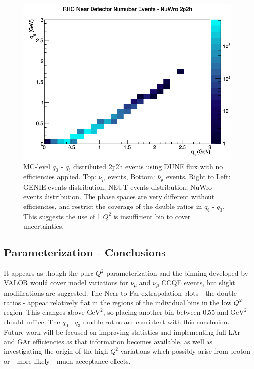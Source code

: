 \documentclass[12pt]{article}
\newcommand{\textapprox}{\raisebox{0.5ex}{\texttildelow}}
\begin{document}
\begin{figure}[h]
\endminipage
{}
\includegraphics[width=\linewidth]{q0_q3/nominal/2p2h_RHC_ND_numubar_q3_q0_NuWro.png}
\endminipage
\caption{MC-level $q_0 \textrm{ - } q_3$ distributed 2p2h events using DUNE flux with no efficiencies applied. Top: $\nu_{\mu}$ events, Bottom: $\overline{\nu}_{\mu}$ events. Right to Left: GENIE events distribution, NEUT events distribution, NuWro events distribution. The phase spaces are very different without efficiencies, and restrict the coverage of the double ratios in $q_0 \textrm{ - } q_3$. This suggests the use of 1 $Q^2$ is insufficient bin to cover uncertainties.}
\label{fig:q0q3_2p2h_events}
\end{figure}
\FloatBarrier

\subsection{Parameterization - Conclusions}
It appears as though the pure-$Q^2$ parameterization and the binning developed by VALOR would cover model variations for $\nu_{\mu}$ and $\overline{\nu}_{\mu}$ CCQE events, but slight modifications are suggested. The Near to Far extrapolation plots - the double ratios - appear relatively flat in the regions of the individual bins in the low $Q^2$ region. This changes above \textapprox{1.25} $\textrm{GeV}^2$, so placing another bin between 0.55 and \textapprox{1.25} $\textrm{GeV}^2$ should suffice. The $q_0 \textrm{ - } q_3$ double ratios are consistent with this conclusion. Future work will be focused on improving statistics and implementing full LAr and GAr efficiencies as that information becomes available, as well as investigating the origin of the high-$Q^2$ variations which possibly arise from proton or - more-likely - muon acceptance effects. 
\end{document}
